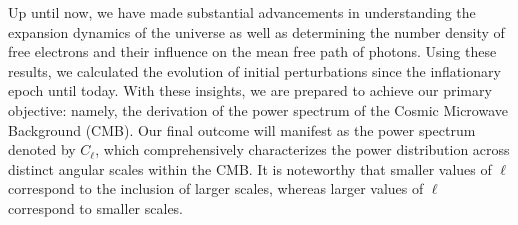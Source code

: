 \documentclass{aa}
\begin{document}
Up until now, we have made substantial advancements in understanding the expansion dynamics of the universe as well as determining the number density of free electrons and their influence on the mean free path of photons. Using these results, we calculated the evolution of initial perturbations since the inflationary epoch until today. With these insights, we are prepared to achieve our primary objective: namely, the derivation of the power spectrum of the Cosmic Microwave Background (CMB). Our final outcome will manifest as the power spectrum denoted by $C_\ell$, which comprehensively characterizes the power distribution across distinct angular scales within the CMB. It is noteworthy that smaller values of $\ell$ correspond to the inclusion of larger scales, whereas larger values of $\ell$ correspond to smaller scales.
\end{document}
